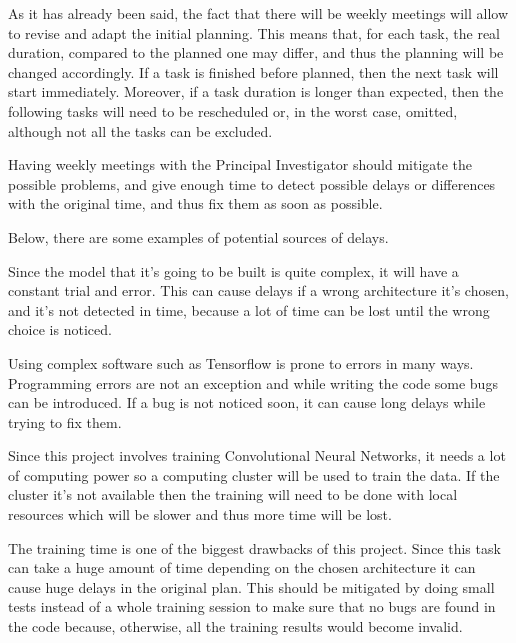 
As it has already been said, the fact that there will be weekly meetings will allow to 
revise and adapt the initial planning. This means that, for each task, the real duration, 
compared to the planned one may differ, and thus the planning will be changed accordingly. 
If a task is finished before planned, then the next task will start immediately. 
Moreover, if a task duration is longer than expected, then the following tasks will need 
to be rescheduled or, in the worst case, omitted, although not all the tasks can be excluded.

Having weekly meetings with the Principal Investigator should mitigate the possible problems,
and give enough time to detect possible delays or differences with the original time, and
thus fix them as soon as possible.

Below, there are some examples of potential sources of delays.


Since the model that it's going to be built is quite complex, it will have a constant trial
and error. This can cause delays if a wrong architecture it's chosen, and it's not detected
in time, because a lot of time can be lost until the wrong choice is noticed. 


Using complex software such as Tensorflow is prone to errors in many ways. Programming errors
are not an exception and while writing the code some bugs can be introduced. If a bug is not 
noticed soon, it can cause long delays while trying to fix them.


Since this project involves training Convolutional Neural Networks, it needs a lot of computing 
power so a computing cluster will be used to train the data. If the cluster it's not available
then the training will need to be done with local resources which will be slower and thus 
more time will be lost.


The training time is one of the biggest drawbacks of this project. Since this task
can take a huge amount of time depending on the chosen architecture it can cause
huge delays in the original plan. This should be mitigated by doing small tests
instead of a whole training session to make sure that no bugs are found in the code 
because, otherwise, all the training results would become invalid.
